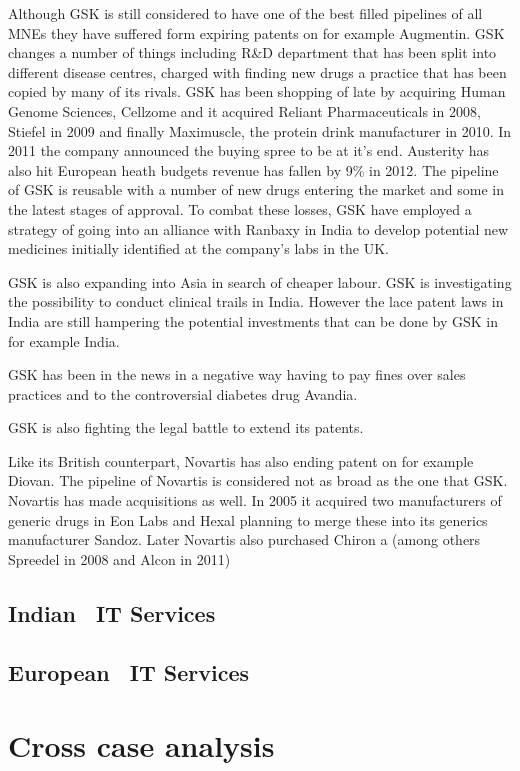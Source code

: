 Although GSK is still considered to have one of the best filled pipelines of all \pharma MNEs they have suffered form expiring patents on for example Augmentin. 
GSK changes a number of things including R\&D department that has been split into different disease centres, charged with finding new drugs a practice that has been copied by many of its rivals.%
GSK has been shopping of late by acquiring Human Genome Sciences, Cellzome and it acquired Reliant Pharmaceuticals in 2008, Stiefel in 2009 %
and finally Maximuscle, the protein drink manufacturer in 2010.
In 2011 the company announced the buying spree to be at it's end.
Austerity has also hit European heath budgets revenue has fallen by 9\% in 2012.
The pipeline of GSK is reusable with a number of new drugs entering the market and some in the latest stages of approval. 
To combat these losses, GSK have employed a strategy of going into an alliance with Ranbaxy in India to develop potential new medicines initially identified at the company's labs in the UK.

GSK is also expanding into Asia in search of cheaper labour.
GSK is investigating the possibility to conduct clinical trails in India.
However the lace patent laws in India are still hampering the potential investments that can be done by GSK in for example India.

GSK has been in the news in a negative way having to pay fines over sales practices and to the controversial diabetes drug Avandia. %

GSK is also fighting the legal battle to extend its patents.


Like its British counterpart, Novartis has also ending patent on for example Diovan.
The pipeline of Novartis is considered not as broad as the one that GSK.
Novartis has made acquisitions as well. 
In 2005 it acquired two manufacturers of generic drugs in Eon Labs and Hexal planning to merge these into its generics manufacturer Sandoz.
Later Novartis also purchased Chiron a   (among others Spreedel in 2008 and Alcon in 2011)
  

\subsection{Indian ~\gls{IT} Services}


\subsection{European ~\gls{IT} Services}

\section{Cross case analysis}